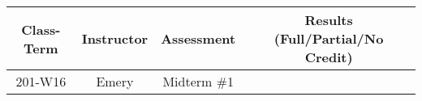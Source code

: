 \begin{outcomes}

\begin{center}
	\begin{tabular}{cccc}
		\hline \hline
                Class-Term & Instructor & Assessment & Results (Full/Partial/No Credit) \\
		\hline
                201-W16 & Emery & Midterm \#1 &  \\
		\hline
	\end{tabular}
\end{center}

\end{outcomes}

\begin{comments}

\end{comments}
